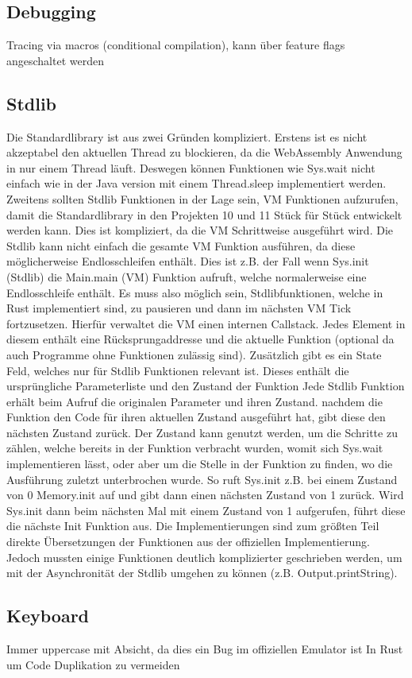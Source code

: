 \subsection{Debugging}
Tracing via macros (conditional compilation), kann über feature flags angeschaltet werden

\subsection{Stdlib}
Die Standardlibrary ist aus zwei Gründen kompliziert. Erstens ist es nicht akzeptabel den aktuellen Thread zu blockieren, da die WebAssembly Anwendung in nur einem Thread läuft. Deswegen können Funktionen wie Sys.wait nicht einfach wie in der Java version mit einem Thread.sleep implementiert werden.
Zweitens sollten Stdlib Funktionen in der Lage sein, VM Funktionen aufzurufen, damit die Standardlibrary in den Projekten 10 und 11 Stück für Stück entwickelt werden kann. Dies ist kompliziert, da die VM Schrittweise ausgeführt wird. Die Stdlib kann nicht einfach die gesamte VM Funktion ausführen, da diese möglicherweise Endlosschleifen enthält. Dies ist z.B. der Fall wenn Sys.init (Stdlib) die Main.main (VM) Funktion aufruft, welche normalerweise eine Endlosschleife enthält.
Es muss also möglich sein, Stdlibfunktionen, welche in Rust implementiert sind, zu pausieren und dann im nächsten VM Tick fortzusetzen.
Hierfür verwaltet die VM einen internen Callstack. Jedes Element in diesem enthält eine Rücksprungaddresse und die aktuelle Funktion (optional da auch Programme ohne Funktionen zulässig sind).
Zusätzlich gibt es ein State Feld, welches nur für Stdlib Funktionen relevant ist. Dieses enthält die ursprüngliche Parameterliste und den Zustand der Funktion
Jede Stdlib Funktion erhält beim Aufruf die originalen Parameter und ihren Zustand.
nachdem die Funktion den Code für ihren aktuellen Zustand ausgeführt hat, gibt diese den nächsten Zustand zurück.
Der Zustand kann genutzt werden, um die Schritte zu zählen, welche bereits in der Funktion verbracht wurden, womit sich Sys.wait implementieren lässt, oder aber um die Stelle in der Funktion zu finden, wo die Ausführung zuletzt unterbrochen wurde. So ruft Sys.init z.B. bei einem Zustand von 0 Memory.init auf und gibt dann einen nächsten Zustand von 1 zurück. Wird Sys.init dann beim nächsten Mal mit einem Zustand von 1 aufgerufen, führt diese die nächste Init Funktion aus.
Die Implementierungen sind zum größten Teil direkte Übersetzungen der Funktionen aus der offiziellen Implementierung. Jedoch mussten einige Funktionen deutlich komplizierter geschrieben werden, um mit der Asynchronität der Stdlib umgehen zu können (z.B. Output.printString).

\subsection{Keyboard}
Immer uppercase mit Absicht, da dies ein Bug im offiziellen Emulator ist
In Rust um Code Duplikation zu vermeiden
